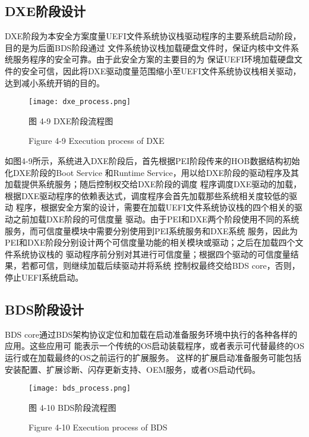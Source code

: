 \subsection{DXE阶段设计}
DXE阶段为本安全方案度量UEFI文件系统协议栈驱动程序的主要系统启动阶段，目的是为后面BDS阶段通过
文件系统协议栈加载硬盘文件时，保证内核中文件系统服务程序的安全可靠。由于此安全方案的主要目的为
保证UEFI环境加载硬盘文件的安全可信，因此将DXE驱动度量范围缩小至UEFI文件系统协议栈相关驱动，
达到减小系统开销的目的。

\begin{figure}[htb]
    \vspace{0cm}   
    \setlength{\abovecaptionskip}{0.3cm}
	\centering
    \texttt{[image: dxe\_process.png]}
    \caption*{图 4-9 DXE阶段流程图}
    \setlength{\belowcaptionskip}{-0.7cm}
    \caption*{Figure 4-9 Execution process of DXE}
\end{figure}

如图4-9所示，系统进入DXE阶段后，首先根据PEI阶段传来的HOB数据结构初始化DXE阶段的Boot Service
和Runtime Service，用以给DXE阶段的驱动程序及其加载提供系统服务；随后控制权交给DXE阶段的调度
程序调度DXE驱动的加载，根据DXE驱动程序的依赖表达式，调度程序会首先加载那些系统相关度较低的驱动
程序，根据安全方案的设计，需要在加载UEFI文件系统协议栈的四个相关的驱动之前加载DXE阶段的可信度量
驱动。由于PEI和DXE两个阶段使用不同的系统服务，而可信度量模块中需要分别使用到PEI系统服务和DXE系统
服务，因此为PEI和DXE阶段分别设计两个可信度量功能的相关模块或驱动；之后在加载四个文件系统协议栈的
驱动程序前分别对其进行可信度量；根据四个驱动的可信度量结果，若都可信，则继续加载后续驱动并将系统
控制权最终交给BDS core，否则，停止UEFI系统启动。

\subsection{BDS阶段设计}
BDS core通过BDS架构协议定位和加载在启动准备服务环境中执行的各种各样的应用。这些应用可
能表示一个传统的OS启动装载程序，或者表示可代替最终的OS运行或在加载最终的OS之前运行的扩展服务。
这样的扩展启动准备服务可能包括安装配置、扩展诊断、闪存更新支持、OEM服务，或者OS启动代码。

\begin{figure}[htb]
    \vspace{0cm}   
    \setlength{\abovecaptionskip}{0.3cm}
	\centering
    \texttt{[image: bds\_process.png]}
    \caption*{图 4-10 BDS阶段流程图}
    \setlength{\belowcaptionskip}{-0.7cm}
    \caption*{Figure 4-10 Execution process of BDS}
\end{figure}

